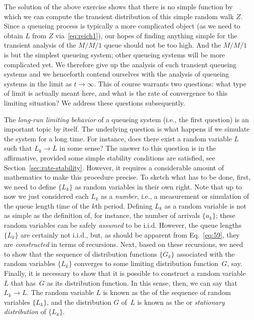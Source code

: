 The solution of the above exercise shows that there is no simple
function by which we can compute the transient distribution of 
this simple random walk $Z$. Since a queueing process is typically a
more complicated object (as we need to obtain $L$ from $Z$ via~\eqref{eq:reich1}), our
hopes of finding anything simple for the transient analysis of the
$M/M/1$ queue should not be too high. And the $M/M/1$ is but the
simplest queueing system; other queueing systems will be more
complicated yet.  We therefore give up the analysis of such transient
queueing systems and we henceforth contend ourselves with the analysis
of queueing systems in the limit as $t\to\infty$.  This of course
warrants two questions: what type of limit is actually meant here, and
what is the rate of convergence to this limiting situation? We address
these questions subsequently.

The \emph{long-run limiting behavior} of a queueing system (i.e., the first question) is an important topic by itself.
The underlying question is what happens if we simulate the system for a long time.
For instance, does there exist a random variable $L$ such that $L_k\to L$ in some sense?
The answer to this question is in the affirmative, provided some simple stability conditions are satisfied, see Section~\ref{sec:rate-stability}.
However, it requires a considerable amount of mathematics to make this procedure precise.
To sketch what has to be done, first, we need to define $\{L_k\}$ as random variables in their own right.
Note that up to now we just considered each $L_k$ as a \emph{number}, i.e., a measurement or simulation of the queue length time of the $k$th period.
Defining $L_k$ as a random variable is not as simple as the definition of, for instance, the number of arrivals $\{a_k\}$; these random variables can be safely \emph{assumed} to be i.i.d.
However, the queue lengths $\{L_k\}$ are certainly not i.i.d., but, as should be apparent from Eq.~\eqref{eq:59}, they are \emph{constructed} in terms of recursions.
Next, based on these recursions, we need to show that the sequence of distribution functions $\{G_k\}$ associated with the random variables $\{L_k\}$ converges to some limiting distribution function~$G$, say.
Finally, it is necessary to show that it is possible to construct a random variable~$L$ that has~$G$ as its distribution function.
In this sense, then, we can say that~$L_k \to L$.
The random variable $L$ is known as the  of the sequence of random variables $\{L_k\}$, and the distribution $G$ of~$L$ is known as the  or \emph{stationary distribution} of $\{L_k\}$.

